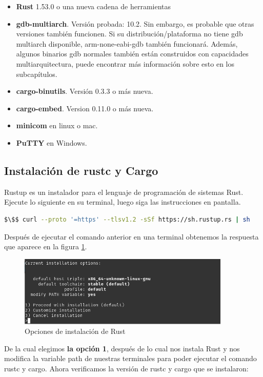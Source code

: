 \begin{itemize}
	\item \textbf{Rust} 1.53.0 o una nueva cadena de herramientas
	\item \textbf{gdb-multiarch}. Versión probada: 10.2. Sin embargo, es probable que otras versiones también funcionen. Si su distribución/plataforma no tiene gdb multiarch disponible, arm-none-eabi-gdb también funcionará. Además, algunos binarios gdb normales también están construidos con capacidades multiarquitectura, puede encontrar más información sobre esto en los subcapítulos.
	\item \textbf{cargo-binutils}. Versión 0.3.3 o más nueva.
	\item \textbf{cargo-embed}. Version 0.11.0 o más nueva.
	\item \textbf{minicom} en linux o mac. 
	\item \textbf{PuTTY} en Windows.
\end{itemize}

\subsection{Instalación de rustc y Cargo}

Rustup es un instalador para el lenguaje de programación de sistemas Rust. Ejecute lo siguiente en su terminal, luego siga las instrucciones en pantalla.


\begin{lstlisting}[language=bash]
$\$$ curl --proto '=https' --tlsv1.2 -sSf https://sh.rustup.rs | sh
\end{lstlisting} 

Después de ejecutar el comando anterior en una terminal obtenemos la respuesta que aparece en la figura \ref*{cap1:004}. 

\begin{figure}[htb]
	\centering
	\includegraphics[width=0.9\textwidth]{capitulo1/rustup.png}
	\caption{Opciones de instalación de Rust}
	\label{cap1:004}
\end{figure} 

De la cual elegimos \textbf{la opción 1}, después de lo cual nos instala Rust y nos modifica la variable path de nuestras terminales para poder ejecutar el comando rustc y cargo. Ahora verificamos la versión de rustc y cargo que se instalaron:

